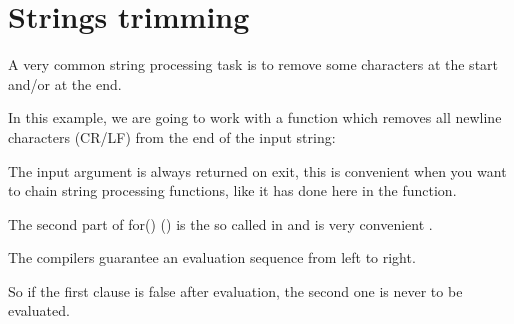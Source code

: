 \section{Strings trimming}
\newcommand{\CRLF}{\ac{CR}/\ac{LF}}

A very common string processing task is to remove some characters at the start and/or at the end.

In this example, we are going to work with a function which removes all newline characters 
(\CRLF{}) from the end of the input string:



The input argument is always returned on exit, this is convenient when you want to chain 
string processing functions, like it has done here in the \main function.

The second part of for() () is the so called  
in \CCpp and is very convenient .

The \CCpp compilers guarantee an evaluation sequence from left to right.

So if the first clause is false after evaluation, the second one is never to be evaluated.







